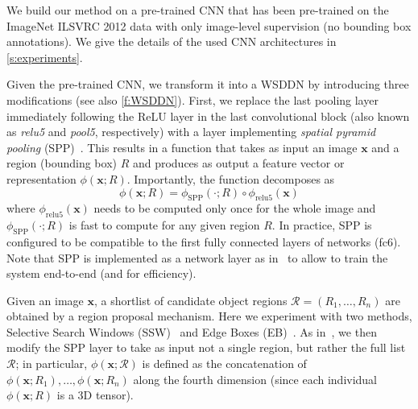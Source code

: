 \documentclass[10pt,twocolumn,letterpaper]{article}
\newcommand{\bx}{\mathbf{x}}
\begin{document}
We build our method on a pre-trained CNN that has been pre-trained on the ImageNet ILSVRC 2012 data \cite{Russakovsky15} with only image-level supervision (\ie no bounding box annotations). We give the details of the used CNN architectures in \cref{s:experiments}. 

Given the pre-trained CNN, we transform it into a WSDDN by introducing three modifications (see also \cref{f:WSDDN}). First, we replace the last pooling layer immediately following the ReLU layer in the last convolutional block (also known as \textit{relu5} and \textit{pool5}, respectively) with a layer implementing \emph{spatial pyramid pooling} (SPP)~\cite{Lazebnik06,He14}. This results in a function that takes as input an image $\bx$ and a region (bounding box) $R$ and produces as output a feature vector or representation $\phi(\bx;R)$. Importantly, the function decomposes as
\[
\phi(\bx;R) = \phi_{\text{SPP}}(\cdot ; R) \circ \phi_{\text{relu5}}(\bx)
\]
where $\phi_{\text{relu5}}(\bx)$ needs to be computed only once for the whole image and $\phi_{\text{SPP}}(\cdot ; R)$ is fast to compute for any given region $R$. In practice, SPP is configured to be compatible to the first fully connected layers of networks (\ie fc6). Note that SPP is implemented as a network layer as in~\cite{Girshick15} to allow to train the system end-to-end (and for efficiency).

Given an image $\bx$, a shortlist of candidate object regions $\mathcal{R} = (R_1,\dots,R_n)$ are obtained by a region proposal mechanism. Here we experiment with two methods, Selective Search Windows (SSW)~\cite{Sande11} and Edge Boxes (EB)~\cite{Zitnick14}. As in~\cite{Girshick15}, we then modify the SPP layer to take as input not a single region, but rather the full list $\mathcal{R}$; in particular, $\phi(\bx;\mathcal{R})$ is defined as the concatenation of $\phi(\bx;R_1), \dots, \phi(\bx;R_n)$ along the fourth dimension (since each individual $\phi(\bx;R)$ is a 3D tensor).
\end{document}
